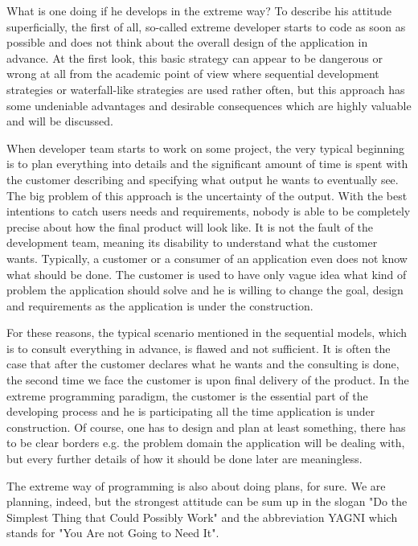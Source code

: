 \documentclass[12pt,final,oneside]{fithesis}
\begin{document}
What is one doing if he develops in the extreme way? To describe his attitude superficially, the first of all, so-called extreme developer starts to code as soon as possible and does not think about the overall design of the application in advance. At the first look, this basic strategy can appear to be dangerous or wrong at all from the academic point of view where sequential development strategies or waterfall-like strategies are used rather often, but this approach has some undeniable advantages and desirable consequences which are highly valuable and will be discussed.

When developer team starts to work on some project, the very typi\-cal beginning is to plan everything into details and the significant amount of time is spent with the customer describing and specifying what output he wants to eventually see. The big problem of this app\-roach is the uncertainty of the output. With the best intentions to catch users needs and requirements, nobody is able to be completely precise about how the final product will look like. It is not the fault of the development team, meaning its disability to understand what the customer wants. Typically, a customer or a consumer of an application even does not know what should be done. The customer is used to have only vague idea what kind of problem the application should solve and he is willing to change the goal, design and requirements as the application is under the construction.

For these reasons, the typical scenario mentioned in the sequential models, which is to consult everything in advance, is flawed and not sufficient. It is often the case that after the customer declares what he wants and the consulting is done, the second time we face the customer is upon final delivery of the product. In the extreme programming paradigm, the customer is the essential part of the developing process and he is participating all the time application is under construction. Of course, one has to design and plan at least something, there has to be clear borders e.g. the problem domain the application will be dealing with, but every further details of how it should be done later are meaningless.

The extreme way of programming is also about doing plans, for sure. We are planning, indeed, but the strongest attitude can be sum up in the slogan "Do the Simplest Thing that Could Possibly Work" and the abbreviation YAGNI which stands for "You Are not Going to Need It".
\end{document}
